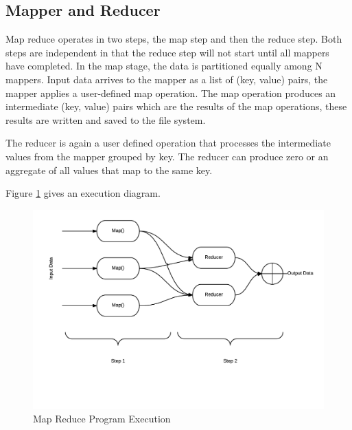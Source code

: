 \documentclass[10pt,twocolumn]{IEEEtran11}
\begin{document}
\subsection{Mapper and Reducer}
Map reduce operates in two steps, the map step and then the reduce step.  Both steps are independent in that the reduce step will not start until all mappers have completed.
In the map stage, the data is partitioned equally among N mappers.  Input data arrives to the mapper as a list of (key, value) pairs, the mapper applies a user-defined map operation.
The map operation produces an intermediate (key, value) pairs which are the results of the map operations, these results are written and saved to the file system.  
\par
The reducer is again a user defined operation that processes the intermediate values from the mapper grouped by key.  The reducer can produce zero or an aggregate of all values
that map to the same key.

Figure \ref{fig:mapReduce} gives an execution diagram.
\begin{figure}[h]
\centering
\includegraphics[scale=0.50]{images/mapReduce.png}
\caption{Map Reduce Program Execution}
\label{fig:mapReduce}
\end{figure}
\end{document}
